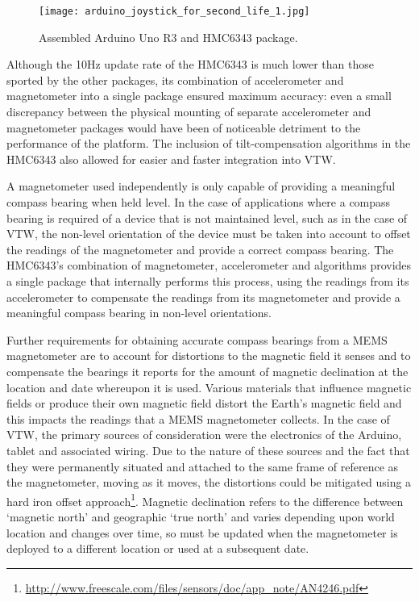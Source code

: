 
\begin{figure}[h]
\centering
  \texttt{[image: arduino\_joystick\_for\_second\_life\_1.jpg]}
  \caption{Assembled Arduino Uno R3 and HMC6343 package.}
  \label{arduino_joystick_for_second_life_1.jpg}
\end{figure}

Although the 10Hz update rate of the HMC6343 is much lower than those sported by the other packages, its combination of accelerometer and magnetometer into a single package ensured maximum accuracy: even a small discrepancy between the physical mounting of separate accelerometer and magnetometer packages would have been of noticeable detriment to the performance of the platform. The inclusion of tilt-compensation algorithms in the HMC6343 also allowed for easier and faster integration into VTW.

A magnetometer used independently is only capable of providing a meaningful compass bearing when held level. In the case of applications where a compass bearing is required of a device that is not maintained level, such as in the case of VTW, the non-level orientation of the device must be taken into account to offset the readings of the magnetometer and provide a correct compass bearing. The HMC6343's combination of magnetometer, accelerometer and algorithms provides a single package that internally performs this process, using the readings from its accelerometer to compensate the readings from its magnetometer and provide a meaningful compass bearing in non-level orientations.

Further requirements for obtaining accurate compass bearings from a MEMS magnetometer are to account for distortions to the magnetic field it senses and to compensate the bearings it reports for the amount of magnetic declination at the location and date whereupon it is used. Various materials that influence magnetic fields or produce their own magnetic field distort the Earth's magnetic field and this impacts the readings that a MEMS magnetometer collects. In the case of VTW, the primary sources of consideration were the electronics of the Arduino, tablet and associated wiring. Due to the nature of these sources and the fact that they were permanently situated and attached to the same frame of reference as the magnetometer, moving as it moves, the distortions could be mitigated using a hard iron offset approach\footnote{\url{http://www.freescale.com/files/sensors/doc/app_note/AN4246.pdf}}. Magnetic declination refers to the difference between `magnetic north' and geographic `true north' and varies depending upon world location and changes over time, so must be updated when the magnetometer is deployed to a different location or used at a subsequent date.

